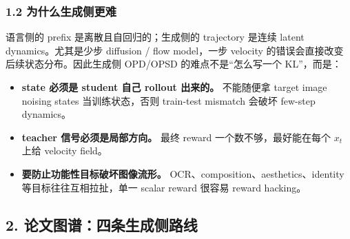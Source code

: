 \subsubsection{1.2 为什么生成侧更难}

语言侧的 prefix 是离散且自回归的；生成侧的 trajectory 是连续 latent dynamics。尤其是少步 diffusion / flow model，一步 velocity 的错误会直接改变后续状态分布。因此生成侧 OPD/OPSD 的难点不是“怎么写一个 KL”，而是：

\begin{itemize}[leftmargin=1.5em]
  \item \textbf{state 必须是 student 自己 rollout 出来的。} 不能随便拿 target image noising states 当训练状态，否则 train-test mismatch 会破坏 few-step dynamics。
  \item \textbf{teacher 信号必须是局部方向。} 最终 reward 一个数不够，最好能在每个 $x_t$ 上给 velocity field。
  \item \textbf{要防止功能性目标破坏图像流形。} OCR、composition、aesthetics、identity 等目标往往互相拉扯，单一 scalar reward 很容易 reward hacking。
\end{itemize}

\subsection{2. 论文图谱：四条生成侧路线}


